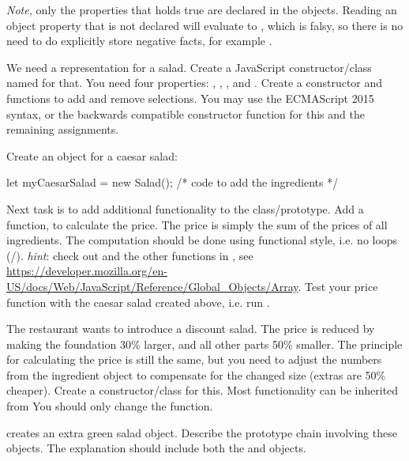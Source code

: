 \documentclass[fleqn, article, a4paper]{memoir}
\begin{document}
\begin{Assignments}
\noindent \emph{Note,} only the properties that holds true are declared in the objects. Reading an object property that is not declared will evaluate to , which is falsy, so there is no need to do explicitly store negative facts, for example .

\item We need a representation for a salad. Create a JavaScript constructor/class named  for that. You need four properties: , , , and . Create a constructor and functions to add and remove selections. You may use the ECMAScript 2015  syntax, or the backwards compatible constructor function for this and the remaining assignments.

\item Create an object for a caesar salad:
\begin{Code}
let myCaesarSalad = new Salad();
/* code to add the ingredients */
\end{Code}
\item Next task is to add additional functionality to the  class/prototype. Add a function,  to calculate the price. The price is simply the sum of the prices of all ingredients. The computation should be done using functional style, i.e. no loops (/). \emph{hint}: check out  and the other functions in , see \url{https://developer.mozilla.org/en-US/docs/Web/JavaScript/Reference/Global_Objects/Array}. Test your price function with the caesar salad created above, i.e. run .

\item The restaurant wants to introduce a discount salad. The price is reduced by making the foundation 30\% larger, and all other parts 50\% smaller. The principle for calculating the price is still the same, but you need to adjust the numbers from the ingredient object to compensate for the changed size (extras are 50\% cheaper). Create a  constructor/class for this. Most functionality can be inherited from  You should only change the  function.

\item {} creates an extra green salad object. Describe the prototype chain involving these objects. The explanation should include both the  and  objects.


\end{Assignments}
\end{document}
